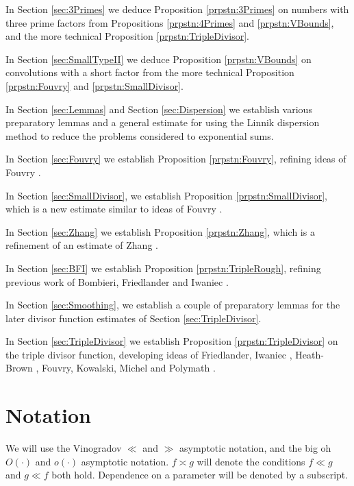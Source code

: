 \documentclass[10pt]{amsart}
\theoremstyle{plain}
\numberwithin{equation}{section}
\begin{document}
In Section \ref{sec:3Primes} we deduce Proposition \ref{prpstn:3Primes} on numbers with three prime factors from Propositions \ref{prpstn:4Primes} and \ref{prpstn:VBounds}, and the more technical Proposition \ref{prpstn:TripleDivisor}.

In Section \ref{sec:SmallTypeII} we deduce Proposition \ref{prpstn:VBounds} on convolutions with a short factor from the more technical Proposition \ref{prpstn:Fouvry} and \ref{prpstn:SmallDivisor}.

In Section \ref{sec:Lemmas} and Section \ref{sec:Dispersion} we establish various preparatory lemmas and a general estimate for using the Linnik dispersion method to reduce the problems considered  to exponential sums.

In Section \ref{sec:Fouvry} we establish Proposition \ref{prpstn:Fouvry}, refining ideas of Fouvry \cite{Fouvry}.

In Section \ref{sec:SmallDivisor}, we establish Proposition \ref{prpstn:SmallDivisor}, which is a new estimate similar to ideas of Fouvry \cite{Fouvry}.

In Section \ref{sec:Zhang} we establish Proposition \ref{prpstn:Zhang}, which is a refinement of an estimate of Zhang \cite{Zhang}.

In Section \ref{sec:BFI} we establish Proposition \ref{prpstn:TripleRough}, refining previous work of Bombieri, Friedlander and Iwaniec \cite[Theorem 4]{BFI2}.

In Section \ref{sec:Smoothing}, we establish a couple of preparatory lemmas for the later divisor function estimates of Section \ref{sec:TripleDivisor}.

In Section \ref{sec:TripleDivisor} we establish Proposition \ref{prpstn:TripleDivisor} on the triple divisor function, developing ideas of Friedlander, Iwaniec \cite{FIDivisor}, Heath-Brown \cite{HBDivisor}, Fouvry, Kowalski, Michel \cite{FKMDivisor} and Polymath \cite{Polymath}.
%
%
%
%
%
%
%
%
%
%
%
%
%
%
%
%
%
%
%
%
\section{Notation}
%
%
%
%
We will use the Vinogradov $\ll$ and $\gg$ asymptotic notation, and the big oh $O(\cdot)$ and $o(\cdot)$ asymptotic notation. $f\asymp g$ will denote the conditions $f\ll g$ and $g\ll f$ both hold. Dependence on a parameter will be denoted by a subscript.
\end{document}
